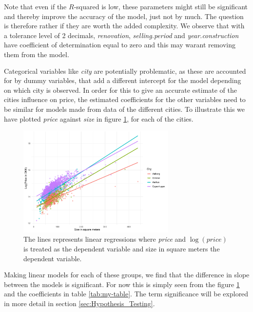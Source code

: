Note that even if the $R$-squared is low, these parameters might still be significant and thereby improve the accuracy of the model, just not by much. 
The question is therefore rather if they are worth the added complexity.
We observe that with a tolerance level of 2 decimals, \textit{renovation}, \textit{selling.period} and \textit{year.construction} have coefficient of determination equal to zero and this may warant removing them from the model.

Categorical variables like \textit{city} are potentially problematic, as these are accounted for by dummy variables, that add a different intercept for the model depending on which city is observed.
In order for this to give an accurate estimate of the cities influence on price, the estimated coefficients for the other variables need to be similar for models made from data of the different cities. 
To illustrate this we have plotted \textit{price} against \textit{size} in figure \ref{fig:Forskellig_haeldning}, for each of the cities.
\begin{figure}[H]
    \centering
    \includegraphics[width = 0.7\textwidth]{figures/Nanna/Forskellig_haeldning.pdf}
    \caption{The lines represents linear regressions where \textit{price} and $\log(price)$ is treated as the dependent variable and size in square meters the dependent variable.}
    \label{fig:Forskellig_haeldning}
\end{figure}
Making linear models for each of these groups, we find that the difference in slope between the models is significant.
For now this is simply seen from the figure \ref{fig:Forskellig_haeldning} and the coefficients in table \ref{tab:my-table}.
The term significance will be explored in more detail in section \ref{sec:Hypothesis_Testing}. 


